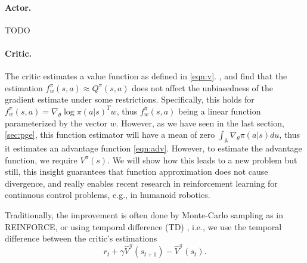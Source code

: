 \paragraph{Actor.} 
TODO

\paragraph{Critic.} 
The critic estimates a value function as defined in \eqref{eqn:v}. 
\cite{Sutton:1999:PGM:3009657.3009806}, and \cite{Konda:2003:AA:942271.942292} find that the estimation $f_w^\pi(s,a) \approx Q^\pi(s,a)$ does not affect the unbiasedness of the gradient estimate under some restrictions. 
Specifically, this holds for $f_w^\pi(s,a) = {\nabla_\theta \log\pi(a|s)}^T w$, thus $f_w^\pi(s,a)$ being a linear function parameterized by the vector $w$. 
However, as we have seen in the last section, \ref{sec:pge}, this function estimator will have a mean of zero $\int_\mathbb{A} \nabla_\theta \pi(a|s)du $, thus it estimates an advantage function \ref{eqn:adv}. 
However, to estimate the advantage function, we require $V^\pi(s)$. 
We will show how this leads to a new problem but still, this insight guarantees that function approximation does not cause divergence, and really enables recent research in reinforcement learning for continuous control problems, e.g., in humanoid robotics.

Traditionally, the improvement is often done by Monte-Carlo sampling as in REINFORCE, or using temporal difference (TD) \cite{Sutton1988}, i.e., we use the temporal difference between the critic's estimations 
\begin{equation}
  r_t + \gamma \hat{V}^\pi(s_{t+1}) - \hat{V}^\pi(s_t).
\end{equation}

